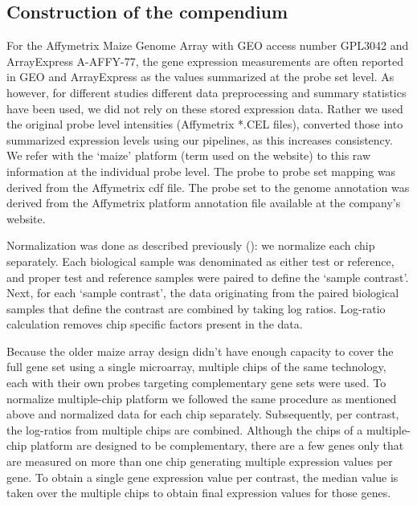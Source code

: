 \subsection{Construction of the compendium} 

For the Affymetrix Maize Genome Array with GEO access number
GPL3042 and ArrayExpress A-AFFY-77, the gene expression
measurements are often reported in GEO and ArrayExpress as the
values summarized at the probe set level.  As however, for
different studies different data preprocessing and summary
statistics have been used, we did not rely on these stored
expression data. Rather we used the original probe level
intensities (Affymetrix *.CEL files), converted those into
summarized expression levels using our pipelines, as this
increases consistency. We refer with the ‘maize’ platform (term
used on the website) to this raw information at the individual
probe level.  The probe to probe set mapping was derived from the
Affymetrix cdf file. The probe set to the genome annotation was
derived from the Affymetrix platform annotation file available at
the company’s website.

Normalization was done as described previously (\cite{Engelen2011}): 
we normalize each chip separately.  Each biological sample
was denominated as either test or reference, and proper test and
reference samples were paired to define the ‘sample
contrast’. Next, for each ‘sample contrast’, the data originating
from the paired biological samples that define the contrast are
combined by taking log ratios. Log-ratio calculation removes chip
specific factors present in the data.

Because the older maize array design didn’t have enough capacity
to cover the full gene set using a single microarray, multiple
chips of the same technology, each with their own probes
targeting complementary gene sets were used. To normalize
multiple-chip platform we followed the same procedure as
mentioned above and normalized data for each chip
separately. Subsequently, per contrast, the log-ratios from
multiple chips are combined. Although the chips of a
multiple-chip platform are designed to be complementary, there
are a few genes only that are measured on more than one chip
generating multiple expression values per gene. To obtain a
single gene expression value per contrast, the median value is
taken over the multiple chips to obtain final expression values
for those genes.


\cleardoublepage

